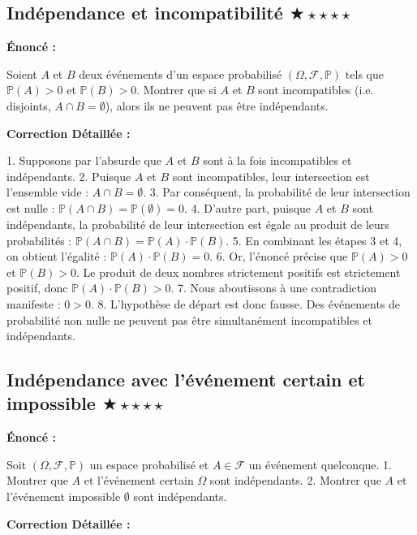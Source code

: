 \documentclass[11pt,a4paper]{article}
\begin{document}
\subsection*{ Indépendance et incompatibilité \quad $\bigstar\star\star\star\star$}

\textbf{Énoncé :}

Soient $A$ et $B$ deux événements d'un espace probabilisé $(\Omega, \mathcal{F}, \mathbb{P})$ tels que $\mathbb{P}(A) > 0$ et $\mathbb{P}(B) > 0$.
Montrer que si $A$ et $B$ sont incompatibles (i.e. disjoints, $A \cap B = \emptyset$), alors ils ne peuvent pas être indépendants.

\textbf{Correction Détaillée :}

1. Supposons par l'absurde que $A$ et $B$ sont à la fois incompatibles et indépendants.
2. Puisque $A$ et $B$ sont incompatibles, leur intersection est l'ensemble vide : $A \cap B = \emptyset$.
3. Par conséquent, la probabilité de leur intersection est nulle : $\mathbb{P}(A \cap B) = \mathbb{P}(\emptyset) = 0$.
4. D'autre part, puisque $A$ et $B$ sont indépendants, la probabilité de leur intersection est égale au produit de leurs probabilités : $\mathbb{P}(A \cap B) = \mathbb{P}(A) \cdot \mathbb{P}(B)$.
5. En combinant les étapes 3 et 4, on obtient l'égalité : $\mathbb{P}(A) \cdot \mathbb{P}(B) = 0$.
6. Or, l'énoncé précise que $\mathbb{P}(A) > 0$ et $\mathbb{P}(B) > 0$. Le produit de deux nombres strictement positifs est strictement positif, donc $\mathbb{P}(A) \cdot \mathbb{P}(B) > 0$.
7. Nous aboutissons à une contradiction manifeste : $0 > 0$.
8. L'hypothèse de départ est donc fausse. Des événements de probabilité non nulle ne peuvent pas être simultanément incompatibles et indépendants.


\subsection*{ Indépendance avec l'événement certain et impossible \quad $\bigstar\star\star\star\star$}

\textbf{Énoncé :}

Soit $(\Omega, \mathcal{F}, \mathbb{P})$ un espace probabilisé et $A \in \mathcal{F}$ un événement quelconque.
1. Montrer que $A$ et l'événement certain $\Omega$ sont indépendants.
2. Montrer que $A$ et l'événement impossible $\emptyset$ sont indépendants.

\textbf{Correction Détaillée :}
\end{document}
